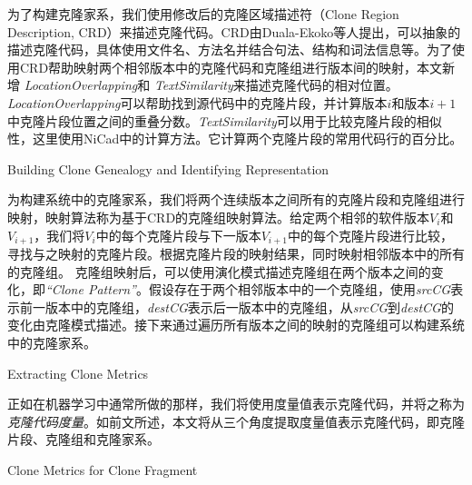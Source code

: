 为了构建克隆家系，我们使用修改后的克隆区域描述符（Clone Region Description, CRD）来描述克隆代码。CRD由Duala-Ekoko等人提出，可以抽象的描述克隆代码，具体使用文件名、方法名并结合句法、结构和词法信息等\cite{duala2010clone}。为了使用CRD帮助映射两个相邻版本中的克隆代码和克隆组进行版本间的映射，本文新增\emph{ LocationOverlapping}和\emph{ TextSimilarity}来描述克隆代码的相对位置\cite{}。{\em LocationOverlapping}可以帮助找到源代码中的克隆片段\cite{kim2005empirical}，并计算版本$ i $和版本$ i + 1 $中克隆片段位置之间的重叠分数。{\em TextSimilarity}可以用于比较克隆片段的相似性，这里使用NiCad中的计算方法。它计算两个克隆片段的常用代码行的百分比。

{Building Clone Genealogy and Identifying Representation}

为构建系统中的克隆家系，我们将两个连续版本之间所有的克隆片段和克隆组进行映射，映射算法称为基于CRD的克隆组映射算法\cite{}。给定两个相邻的软件版本\emph{$V_i$}和\emph{$V_ {i + 1}$}，我们将\emph{$V_i$}中的每个克隆片段与下一版本\emph{$ V_{i+1}$}中的每个克隆片段进行比较，寻找与之映射的克隆片段。根据克隆片段的映射结果，同时映射相邻版本中的所有的克隆组。 
克隆组映射后，可以使用演化模式描述克隆组在两个版本之间的变化，即\emph{``Clone Pattern''}。假设存在于两个相邻版本中的一个克隆组，使用\emph{srcCG}表示前一版本中的克隆组，\emph{destCG}表示后一版本中的克隆组，从\emph{srcCG}到\emph{destCG}的变化由克隆模式描述。接下来通过遍历所有版本之间的映射的克隆组可以构建系统中的克隆家系。


{Extracting Clone Metrics}

正如在机器学习中通常所做的那样，我们将使用度量值表示克隆代码，并将之称为\emph{克隆代码度量}。如前文所述，本文将从三个角度提取度量值表示克隆代码，即克隆片段、克隆组和克隆家系。

{Clone Metrics for Clone Fragment}

